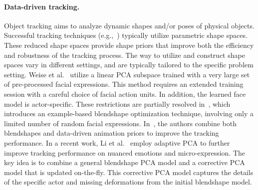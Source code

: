 
%



\paragraph*{Data-driven tracking.} Object tracking aims to analyze dynamic shapes and/or poses of physical objects. Successful tracking techniques (e.g.,~\cite{Weise:2009:FLF,Weise:2011:RPF,Li:2013:RFA,Cao:2013:SRR,Cao:2014:DDE}) typically utilize parametric shape spaces. These reduced shape spaces provide shape priors that improve both the efficiency and robustness of the tracking process. The way to utilize and construct shape spaces vary in different settings, and are typically tailored to the specific problem setting. Weise et al.~\cite{Weise:2009:FLF} utilize a linear PCA subspace trained with a very large set of pre-processed facial expressions. This method requires an extended training session with a careful choice of facial action units. In addition, the learned face model is actor-specific. These restrictions are partially resolved in~\cite{Li:2010:EFR}, which introduces an example-based blendshape optimization technique, involving only a limited number of random facial expressions.
In~\cite{Weise:2011:RPF}, the authors combine both blendshapes and data-driven animation priors to improve the tracking performance. In a recent work, Li et al.~\cite{Li:2013:RFA} employ adaptive PCA to further improve tracking performance on nuanced emotions and micro-expression. The key idea is to combine a general blendshape PCA model and a corrective PCA model that is updated on-the-fly. This corrective PCA model captures the details of the specific actor and missing deformations from the initial blendshape model.


